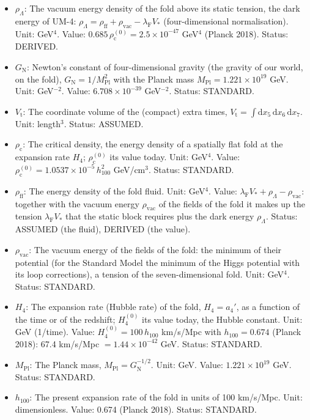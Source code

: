 \documentclass[
  10pt,
]{article}
\begin{document}
\begin{itemize}
  inverse, \(\hat h\) its determinant,
  \(\sqrt{-\hat h} = \mathrm{e}^{3a_4}\); \(\hat h^{(1)}_{\mu\nu}\) its
  first-order cosmological perturbation. Unit: dimensionless. Status:
  DERIVED.
\item
  \(\rho_\Lambda\): The vacuum energy density of the fold above its
  static tension, the dark energy of UM-4:
  \(\rho_\Lambda = \rho_{\mathrm{ff}} + \rho_{\mathrm{vac}} - \lambda_{\mathrm{F}}V_*\)
  (four-dimensional normalisation). Unit: GeV\(^4\). Value:
  \(0.685\,\rho_{\mathrm{c}}^{(0)} = 2.5\times10^{-47}\) GeV\(^4\)
  (Planck 2018). Status: DERIVED.
\item
  \(G_{\mathrm{N}}\): Newton's constant of four-dimensional gravity (the
  gravity of our world, on the fold),
  \(G_{\mathrm{N}} = 1/M_{\mathrm{Pl}}^2\) with the Planck mass
  \(M_{\mathrm{Pl}} = 1.221\times10^{19}\) GeV. Unit: GeV\(^{-2}\).
  Value: \(6.708\times10^{-39}\) GeV\(^{-2}\). Status: STANDARD.
\item
  \(V_{\mathrm{t}}\): The coordinate volume of the (compact) extra
  times,
  \(V_{\mathrm{t}} = \int\mathrm{d}x_5\,\mathrm{d}x_6\,\mathrm{d}x_7\).
  Unit: length\(^3\). Status: ASSUMED.
\item
  \(\rho_{\mathrm{c}}\): The critical density, the energy density of a
  spatially flat fold at the expansion rate \(H_4\);
  \(\rho_{\mathrm{c}}^{(0)}\) its value today. Unit: GeV\(^4\). Value:
  \(\rho_{\mathrm{c}}^{(0)} = 1.0537\times10^{-5}\,h_{100}^2\)
  GeV/cm\(^3\). Status: STANDARD.
\item
  \(\rho_{\mathrm{ff}}\): The energy density of the fold fluid. Unit:
  GeV\(^4\). Value:
  \(\lambda_{\mathrm{F}}V_* + \rho_\Lambda - \rho_{\mathrm{vac}}\):
  together with the vacuum energy \(\rho_{\mathrm{vac}}\) of the fields
  of the fold it makes up the tension \(\lambda_{\mathrm{F}}V_*\) that
  the static block requires plus the dark energy \(\rho_\Lambda\).
  Status: ASSUMED (the fluid), DERIVED (the value).
\item
  \(\rho_{\mathrm{vac}}\): The vacuum energy of the fields of the fold:
  the minimum of their potential (for the Standard Model the minimum of
  the Higgs potential with its loop corrections), a tension of the
  seven-dimensional fold. Unit: GeV\(^4\). Status: STANDARD.
\item
  \(H_4\): The expansion rate (Hubble rate) of the fold, \(H_4 = a_4'\),
  as a function of the time or of the redshift; \(H_4^{(0)}\) its value
  today, the Hubble constant. Unit: GeV (1/time). Value:
  \(H_4^{(0)} = 100\,h_{100}\) km/s/Mpc with \(h_{100} = 0.674\) (Planck
  2018): 67.4 km/s/Mpc \(= 1.44\times10^{-42}\) GeV. Status: STANDARD.
\item
  \(M_{\mathrm{Pl}}\): The Planck mass,
  \(M_{\mathrm{Pl}} = G_{\mathrm{N}}^{-1/2}\). Unit: GeV. Value:
  \(1.221\times10^{19}\) GeV. Status: STANDARD.
\item
  \(h_{100}\): The present expansion rate of the fold in units of 100
  km/s/Mpc. Unit: dimensionless. Value: 0.674 (Planck 2018). Status:
  STANDARD.
\end{itemize}
\end{document}
